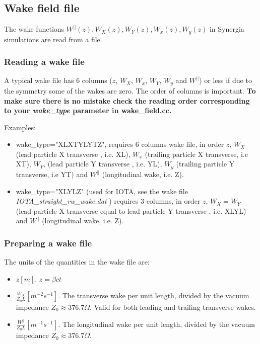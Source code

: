 \documentclass[preprint]{revtex4}
\begin{document}
\subsection{Wake field file}

The wake functions $W^{||}(z),W_X(z), W_Y(z), W_x(z), W_y(z)$  in Synergia simulations are read from a file.

\subsubsection{Reading a wake file}
\label{sssec:rwf}

A typical wake file has 6 columns ($z$, $W_X$, $W_x $, $W_Y$, $W_y$ and $W^{||}$) or less if due to the symmetry
some of the wakes are zero. The order of columns is important. {\bf To make sure there is no mistake check the reading order 
corresponding to your {\em wake\_type} parameter in wake\_field.cc.}

Examples: 
\begin{itemize}

\item wake\_type="XLXTYLYTZ", requires 6 columns wake file, in order $z$, $W_X$ (lead particle X transverse , i.e. XL),
$W_x $ (trailing particle X transverse, i.e XT), $W_Y$, (lead particle Y transverse , i.e. YL),
$W_y $ (trailing particle Y transverse, i.e YT) and $W^{||}$ (longitudinal wake, i.e. Z). 

\item wake\_type="XLYLZ" (used for IOTA, see the wake file {\em IOTA\_straight\_rw\_wake.dat} ) requires 3 columns, in order $z$, $W_X=W_Y$ 
(lead particle X transverse equal to lead particle Y transverse , i.e. XLYL) and 
$W^{||}$ (longitudinal wake, i.e. Z). 
\end{itemize}


\subsubsection{Preparing a wake file}

The units of the quantities in the wake file are:

\begin{itemize}

\item $z[m]$.  $z=\beta c t$
\item  $\frac{W_X}{Z_0 L}[m^{-2} s^{-1}]$. The transverse wake   per unit length,  divided
by the vacuum impedance $Z_0 \approx 376.7 \Omega$. Valid for both leading and trailing transverse wakes.

\item $\frac{W^||}{Z_0 L}[m^{-1} s^{-1}]$.   The longitudinal wake per unit length,  divided
by the vacuum impedance $Z_0 \approx 376.7 \Omega$.
\end{itemize}
\end{document}
